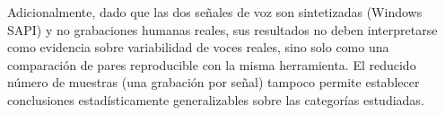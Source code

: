 Adicionalmente, dado que las dos señales de voz son sintetizadas (Windows SAPI) y no grabaciones humanas reales, sus resultados no deben interpretarse como evidencia sobre variabilidad de voces reales, sino solo como una comparación de pares reproducible con la misma herramienta. El reducido número de muestras (una grabación por señal) tampoco permite establecer conclusiones estadísticamente generalizables sobre las categorías estudiadas.
